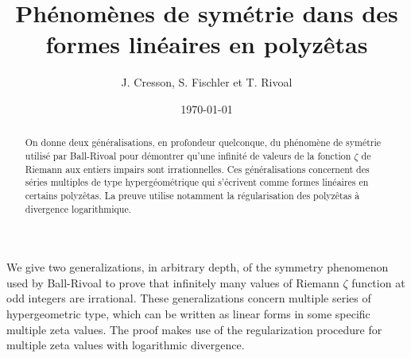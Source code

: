 \documentclass[12pt,francais, reqno]{smfart}
\title[]{Ph\'enom\`enes de sym\'etrie dans des formes lin\'eaires en polyz\^etas}
\author[]{J. Cresson, S. Fischler et T. Rivoal}
\date{\today}
\numberwithin{equation}{section}
\begin{document}
\maketitle

\setcounter{tocdepth}{2}
\baselineskip 6mm


\begin{abstract}
On donne deux g\'en\'eralisations, en profondeur quelconque, du ph\'enom\`ene
de sym\'etrie utilis\'e par Ball-Rivoal pour d\'emontrer qu'une infinit\'e de valeurs de la fonction $\zeta$ de Riemann aux entiers impairs sont irrationnelles. Ces g\'en\'eralisations concernent des s\'eries multiples de type hyperg\'eom\'etrique qui s'\'ecrivent comme   formes lin\'eaires en certains polyz\^etas. La preuve utilise notamment la r\'egularisation des polyz\^etas \`a divergence logarithmique.
\end{abstract}

\begin{altabstract}
We give two generalizations, in arbitrary depth, of the symmetry phenomenon used by  Ball-Rivoal to prove that infinitely many values of Riemann  $\zeta$ function at odd integers are irrational. These generalizations concern multiple series of hypergeometric type, which can be written as linear forms in some specific multiple zeta values. The proof makes use of the regularization procedure for multiple zeta values with logarithmic divergence. 
\end{altabstract}


\tableofcontents
\end{document}
